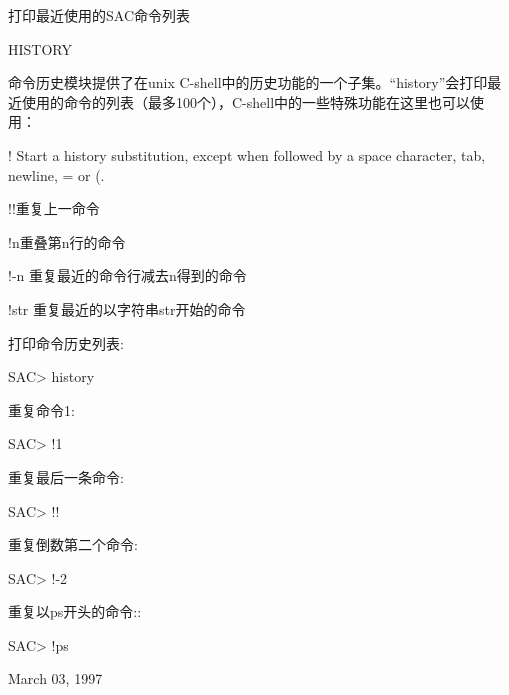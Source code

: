 \label{cmd:history}

打印最近使用的SAC命令列表

HISTORY

命令历史模块提供了在unix C-shell中的历史功能的一个子集。``history''会打印最近使用的命令的列表（最多100个），C-shell中的一些特殊功能在这里也可以使用：

! Start a history substitution, except when followed by a space character, 	tab, newline, = or (.

!!重复上一命令

!n重叠第n行的命令

!-n  重复最近的命令行减去n得到的命令

!str 重复最近的以字符串str开始的命令

打印命令历史列表:
\begin{SACCode}
SAC> history
\end{SACCode}

重复命令1:
\begin{SACCode}
SAC> !1
\end{SACCode}

重复最后一条命令:
\begin{SACCode}
SAC> !!
\end{SACCode}

重复倒数第二个命令:
\begin{SACCode}
SAC> !-2
\end{SACCode}

重复以ps开头的命令::
\begin{SACCode}
SAC> !ps
\end{SACCode}

March 03, 1997
